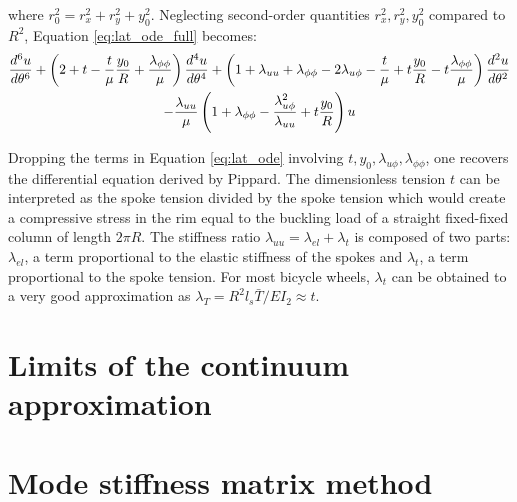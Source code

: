 \documentclass[\rootdir/thesis.tex]{subfiles}
\begin{document}
where $r_0^2=r_x^2+r_y^2+y_0^2$. Neglecting second-order quantities $r_x^2,r_y^2,y_0^2$ compared to $R^2$, Equation \eqref{eq:lat_ode_full} becomes:
\begin{multline}
\label{eq:lat_ode}
  \frac{d^6u}{d\theta^6}
  +\left(2+t-\frac{t}{\mu}\frac{y_0}{R}
         +\frac{\lambda_{\phi\phi}}{\mu}\right) \frac{d^4u}{d\theta^4}
  +\left(1+\lambda_{uu}+\lambda_{\phi\phi}-2\lambda_{u\phi}
         -\frac{t}{\mu}+t\frac{y_0}{R}
         -t\frac{\lambda_{\phi\phi}}{\mu}\right)\frac{d^2u}{d\theta^2}\\
  -\frac{\lambda_{uu}}{\mu}\left(1+\lambda_{\phi\phi}
                                 -\frac{\lambda_{u\phi}^2}{\lambda_{uu}}
                                 +t\frac{y_0}{R}\right)u
\end{multline}

Dropping the terms in Equation \eqref{eq:lat_ode} involving $t, y_0, \lambda_{u\phi}, \lambda_{\phi\phi}$, one recovers the differential equation derived by Pippard\cite{Pippard}. The dimensionless tension $t$ can be interpreted as the spoke tension divided by the spoke tension which would create a compressive stress in the rim equal to the buckling load of a straight fixed-fixed column of length $2\pi R$. The stiffness ratio $\lambda_{uu}=\lambda_{el}+\lambda_t$ is composed of two parts: $\lambda_{el}$, a term proportional to the elastic stiffness of the spokes and $\lambda_t$, a term proportional to the spoke tension. For most bicycle wheels, $\lambda_t$ can be obtained to a very good approximation as $\lambda_T = R^2l_s\bar{T}/EI_2 \approx t$.

\section{Limits of the continuum approximation}


\section{Mode stiffness matrix method}
\end{document}
